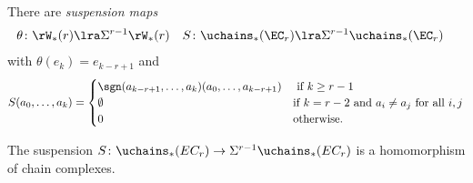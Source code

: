  There are \emph{suspension maps}
\begin{align*}
	\theta\colon \rW_*(r) & \lra \Sigma^{r-1}\rW_*(r) 
 &
	S\colon \uchains_*(\EC_r)&\lra \Sigma^{r-1}\uchains_*(\EC_r) 
 \end{align*}
 with $\theta(e_k)= e_{k-r+1}$ and 
 \[
	S(a_0,\ldots,a_k) = \begin{cases}
		{\sgn(a_{k-r+1},\ldots,a_{k})} (a_{0},\ldots,a_{k-r+1}) & \text{ if $k\geq r-1$} \\
		\emptyset & \text{if $k = r-2$ and $a_i\neq a_j$ for all $i,j$} \\
		0 & \text{otherwise.}
	\end{cases}
\]
\begin{lemma}
	The suspension $S\colon \uchains_*(EC_r)\to \Sigma^{r-1}\uchains_*(EC_r)$ is a homomorphism of chain complexes.
\end{lemma}

